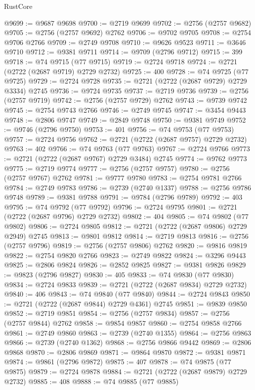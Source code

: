 \begin{lexlean}{RustCore}
\begin{coremodule}
@9699 := @9687 @9698
@9700 := @2719 @9699
@9702 := @2756 (@2757 @9682)
@9705 := @2756 (@2757 @9692) @2762
@9706 := @9702 @9705
@9708 := @2754 @9706 @2766
@9709 := @2749 @9708
@9710 := @9626 @9523
@9711 := @3646 @9710
@9712 := @9381 @9711
@9714 := @9709 (@2796 @9712)
@9715 := 399
@9718 := @74 @9715 (@77 @9715)
@9719 := @2724 @9718
@9724 := @2721 (@2722 (@2687 @9719) @2729 @2732)
@9725 := 400
@9728 := @74 @9725 (@77 @9725)
@9729 := @2724 @9728
@9735 := @2721 (@2722 (@2687 @9729) @2729 @3334) @2745
@9736 := @9724 @9735
@9737 := @2719 @9736
@9739 := @2756 (@2757 @9719)
@9742 := @2756 (@2757 @9729) @2762
@9743 := @9739 @9742
@9745 := @2754 @9743 @2766
@9746 := @2749 @9745
@9747 := @3454 @9443
@9748 := @2806 @9747
@9749 := @2849 @9748
@9750 := @9381 @9749
@9752 := @9746 (@2796 @9750)
@9753 := 401
@9756 := @74 @9753 (@77 @9753)
@9757 := @2724 @9756
@9762 := @2721 (@2722 (@2687 @9757) @2729 @2732)
@9763 := 402
@9766 := @74 @9763 (@77 @9763)
@9767 := @2724 @9766
@9773 := @2721 (@2722 (@2687 @9767) @2729 @3484) @2745
@9774 := @9762 @9773
@9775 := @2719 @9774
@9777 := @2756 (@2757 @9757)
@9780 := @2756 (@2757 @9767) @2762
@9781 := @9777 @9780
@9783 := @2754 @9781 @2766
@9784 := @2749 @9783
@9786 := @2739 (@2740 @1337)
@9788 := @2756 @9786 @9748
@9789 := @9381 @9788
@9791 := @9784 (@2796 @9789)
@9792 := 403
@9795 := @74 @9792 (@77 @9792)
@9796 := @2724 @9795
@9801 := @2721 (@2722 (@2687 @9796) @2729 @2732)
@9802 := 404
@9805 := @74 @9802 (@77 @9802)
@9806 := @2724 @9805
@9812 := @2721 (@2722 (@2687 @9806) @2729 @2949) @2745
@9813 := @9801 @9812
@9814 := @2719 @9813
@9816 := @2756 (@2757 @9796)
@9819 := @2756 (@2757 @9806) @2762
@9820 := @9816 @9819
@9822 := @2754 @9820 @2766
@9823 := @2749 @9822
@9824 := @3296 @9443
@9825 := @2806 @9824
@9826 := @2852 @9825
@9827 := @9381 @9826
@9829 := @9823 (@2796 @9827)
@9830 := 405
@9833 := @74 @9830 (@77 @9830)
@9834 := @2724 @9833
@9839 := @2721 (@2722 (@2687 @9834) @2729 @2732)
@9840 := 406
@9843 := @74 @9840 (@77 @9840)
@9844 := @2724 @9843
@9850 := @2721 (@2722 (@2687 @9844) @2729 @4361) @2745
@9851 := @9839 @9850
@9852 := @2719 @9851
@9854 := @2756 (@2757 @9834)
@9857 := @2756 (@2757 @9844) @2762
@9858 := @9854 @9857
@9860 := @2754 @9858 @2766
@9861 := @2749 @9860
@9863 := @2739 (@2740 @1355)
@9864 := @2756 @9863
@9866 := @2739 (@2740 @1362)
@9868 := @2756 @9866 @9442
@9869 := @2806 @9868
@9870 := @2806 @9869
@9871 := @9864 @9870
@9872 := @9381 @9871
@9874 := @9861 (@2796 @9872)
@9875 := 407
@9878 := @74 @9875 (@77 @9875)
@9879 := @2724 @9878
@9884 := @2721 (@2722 (@2687 @9879) @2729 @2732)
@9885 := 408
@9888 := @74 @9885 (@77 @9885)

\end{coremodule}
\end{lexlean}
